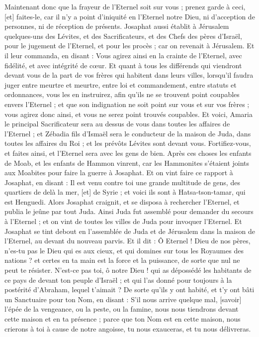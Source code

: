 \begin{multicols}{2}
Maintenant donc que la frayeur de l'Eternel soit sur vous ; prenez garde à ceci, [et] faites-le, car il n'y a point d'iniquité en l'Eternel notre Dieu, ni d'acception de personnes, ni de réception de présents.
Josaphat aussi établit à Jérusalem quelques-uns des Lévites, et des Sacrificateurs, et des Chefs des pères d'Israël, pour le jugement de l'Eternel, et pour les procès ; car on revenait à Jérusalem.
Et il leur commanda, en disant : Vous agirez ainsi en la crainte de l'Eternel, avec fidélité, et avec intégrité de cœur.
Et quant à tous les différends qui viendront devant vous de la part de vos frères qui habitent dans leurs villes, lorsqu'il faudra juger entre meurtre et meurtre, entre loi et commandement, entre statuts et ordonnances, vous les en instruirez, afin qu'ils ne se trouvent point coupables envers l'Eternel ; et que son indignation ne soit point sur vous et sur vos frères ; vous agirez donc ainsi, et vous ne serez point trouvés coupables.
Et voici, Amaria le principal Sacrificateur sera au dessus de vous dans toutes les affaires de l'Eternel ; et Zébadia fils d'Ismaël sera le conducteur de la maison de Juda, dans toutes les affaires du Roi ; et les prévôts Lévites sont devant vous. Fortifiez-vous, et faites ainsi, et l'Eternel sera avec les gens de bien.
\VerseOne{}Après ces choses les enfants de Moab, et les enfants de Hammon vinrent, car les Hammonites s'étaient joints aux Moabites pour faire la guerre à Josaphat.
Et on vint faire ce rapport à Josaphat, en disant : Il est venu contre toi une grande multitude de gens, des quartiers de delà la mer, [et] de Syrie ; et voici ils sont à Hatsa-tson-tamar, qui est Henguedi.
Alors Josaphat craignit, et se disposa à rechercher l'Eternel, et publia le jeûne par tout Juda.
Ainsi Juda fut assemblé pour demander du secours à l'Eternel ; et on vint de toutes les villes de Juda pour invoquer l'Eternel.
Et Josaphat se tint debout en l'assemblée de Juda et de Jérusalem dans la maison de l'Eternel, au devant du nouveau parvis.
Et il dit : Ô Eternel ! Dieu de nos pères, n'es-tu pas le Dieu qui es aux cieux, et qui domines sur tous les Royaumes des nations ? et certes en ta main est la force et la puissance, de sorte que nul ne peut te résister.
N'est-ce pas toi, ô notre Dieu ! qui as dépossédé les habitants de ce pays de devant ton peuple d'Israël ; et qui l'as donné pour toujours à la postérité d'Abraham, lequel t'aimait ?
De sorte qu'ils y ont habité, et t'y ont bâti un Sanctuaire pour ton Nom, en disant :
S'il nous arrive quelque mal, [savoir] l'épée de la vengeance, ou la peste, ou la famine, nous nous tiendrons devant cette maison et en ta présence ; parce que ton Nom est en cette maison, nous crierons à toi à cause de notre angoisse, tu nous exauceras, et tu nous délivreras.

\end{multicols}
